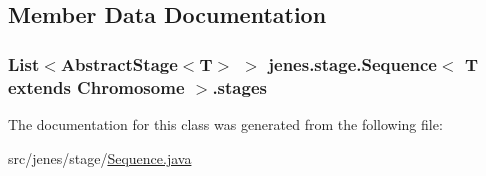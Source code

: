 \subsection{Member Data Documentation}
\hypertarget{classjenes_1_1stage_1_1_sequence_3_01_t_01extends_01_chromosome_01_4_a7bf8fc1d26c7aadb73974beccf970343}{
\subsubsection[{stages}]{\setlength{\rightskip}{0pt plus 5cm}List$<$Abstract\-Stage$<$T$>$ $>$ jenes.\-stage.\-Sequence$<$ T extends Chromosome $>$.stages\hspace{0.3cm}{\ttfamily [private]}}}\label{classjenes_1_1stage_1_1_sequence_3_01_t_01extends_01_chromosome_01_4_a7bf8fc1d26c7aadb73974beccf970343}


The documentation for this class was generated from the following file\-:\begin{DoxyCompactItemize}
\item 
src/jenes/stage/\hyperlink{_sequence_8java}{Sequence.\-java}\end{DoxyCompactItemize}
